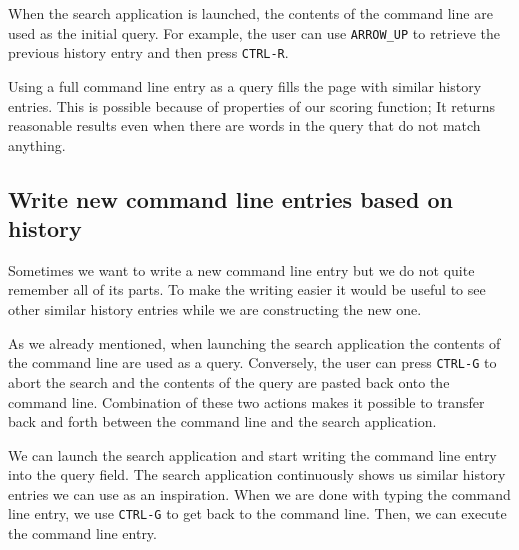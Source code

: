 When the search application is launched, the contents of the command line are used as the initial query. For example, the user can use \verb|ARROW_UP| to retrieve the previous history entry and then press \verb|CTRL-R|. 

Using a full command line entry as a query fills the page with similar history entries. This is possible because of properties of our scoring function; It returns reasonable results even when there are words in the query that do not match anything. 

\subsection{Write new command line entries based on history}

Sometimes we want to write a new command line entry but we do not quite remember all of its parts. To make the writing easier it would be useful to see other similar history entries while we are constructing the new one.

As we already mentioned, when launching the search application the contents of the command line are used as a query. Conversely, the user can press \verb|CTRL-G| to abort the search and the contents of the query are pasted back onto the command line.
Combination of these two actions makes it possible to transfer back and forth between the command line and the search application. 


We can launch the search application and start writing the command line entry into the query field. The search application continuously shows us similar history entries we can use as an inspiration. When we are done with typing the command line entry, we use \verb|CTRL-G| to get back to the command line. Then, we can execute the command line entry.


